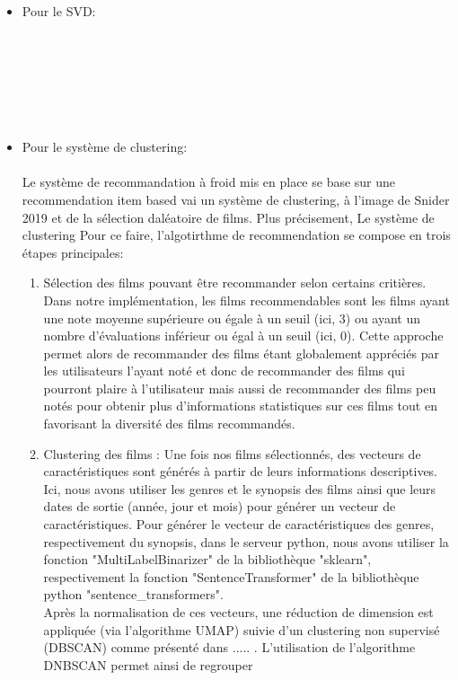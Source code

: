 \documentclass{article}
\begin{document}
\begin{itemize}
    \item Pour le SVD: \\
    \\
    \\
    \\
    \\
    \\
    \\
    \item Pour le système de clustering:\\
    $ $\\
    Le système de recommandation à froid mis en place se base sur une recommendation item based vai un système de clustering, à l'image de Snider 2019 \cite{snider_unsupervised} et de la sélection daléatoire de films.
    Plus précisement, Le système de clustering
    Pour ce faire, l'algotirthme de recommendation se compose en trois étapes principales:\\
    \begin{enumerate}
        \item Sélection des films pouvant être recommander selon certains critières. Dans notre implémentation, les films recommendables sont les films ayant une note moyenne supérieure ou égale à un seuil (ici, 3) ou 
        ayant un nombre d’évaluations inférieur ou égal à un seuil (ici, 0). Cette approche permet alors de recommander des films étant globalement appréciés par les utilisateurs l'ayant noté et donc de recommander des films qui 
        pourront plaire à l'utilisateur mais aussi de recommander des films peu notés pour obtenir plus d'informations statistiques sur ces films tout en favorisant la diversité des films recommandés.
        \item Clustering des films : Une fois nos films sélectionnés, des vecteurs de caractéristiques sont générés à partir de leurs informations descriptives. Ici, nous avons utiliser les genres et le synopsis des films ainsi que leurs dates de 
        sortie (année, jour et mois) pour générer un vecteur de caractéristiques. Pour générer le vecteur de caractéristiques des genres, respectivement du synopsis, dans le serveur python, nous avons utiliser la fonction "MultiLabelBinarizer" de 
        la bibliothèque "sklearn", respectivement la fonction "SentenceTransformer" de la bibliothèque python "sentence\_transformers".\\
        Après la normalisation de ces vecteurs, une réduction de dimension est appliquée (via l’algorithme UMAP) suivie d’un clustering non supervisé (DBSCAN) comme présenté dans ..... . L'utilisation de l'algorithme DNBSCAN permet ainsi de regrouper

\end{enumerate}
\end{itemize}
\end{document}

